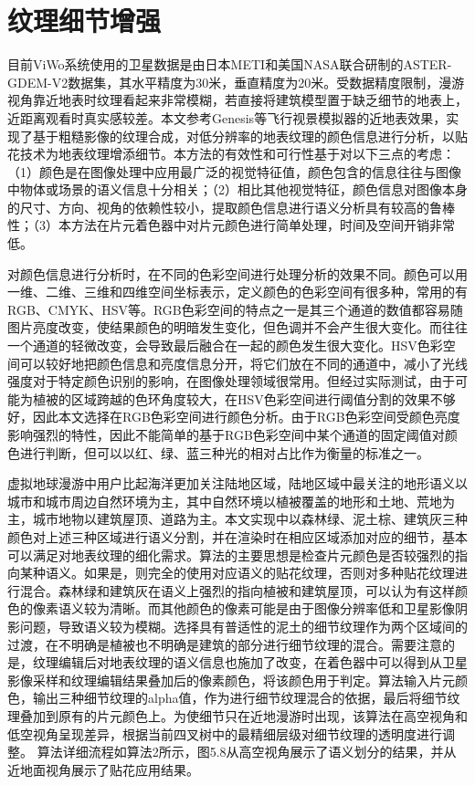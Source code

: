 \section{纹理细节增强}
目前ViWo系统使用的卫星数据是由日本METI和美国NASA联合研制的ASTER-GDEM-V2数据集，其水平精度为30米，垂直精度为20米。受数据精度限制，漫游视角靠近地表时纹理看起来非常模糊，若直接将建筑模型置于缺乏细节的地表上，近距离观看时真实感较差。本文参考Genesis\supercite{genesis}等飞行视景模拟器的近地表效果，实现了基于粗糙影像的纹理合成，对低分辨率的地表纹理的颜色信息进行分析，以贴花技术为地表纹理增添细节。本方法的有效性和可行性基于对以下三点的考虑：（1）颜色是在图像处理中应用最广泛的视觉特征值，颜色包含的信息往往与图像中物体或场景的语义信息十分相关；（2）相比其他视觉特征，颜色信息对图像本身的尺寸、方向、视角的依赖性较小，提取颜色信息进行语义分析具有较高的鲁棒性；（3）本方法在片元着色器中对片元颜色进行简单处理，时间及空间开销非常低。\par
对颜色信息进行分析时，在不同的色彩空间进行处理分析的效果不同。颜色可以用一维、二维、三维和四维空间坐标表示，定义颜色的色彩空间有很多种，常用的有RGB、CMYK、HSV等。RGB色彩空间的特点之一是其三个通道的数值都容易随图片亮度改变，使结果颜色的明暗发生变化，但色调并不会产生很大变化。而往往一个通道的轻微改变，会导致最后融合在一起的颜色发生很大变化。HSV色彩空间可以较好地把颜色信息和亮度信息分开，将它们放在不同的通道中，减小了光线强度对于特定颜色识别的影响，在图像处理领域很常用。但经过实际测试，由于可能为植被的区域跨越的色环角度较大，在HSV色彩空间进行阈值分割的效果不够好，因此本文选择在RGB色彩空间进行颜色分析。由于RGB色彩空间受颜色亮度影响强烈的特性，因此不能简单的基于RGB色彩空间中某个通道的固定阈值对颜色进行判断，但可以以红、绿、蓝三种光的相对占比作为衡量的标准之一。\par
虚拟地球漫游中用户比起海洋更加关注陆地区域，陆地区域中最关注的地形语义以城市和城市周边自然环境为主，其中自然环境以植被覆盖的地形和土地、荒地为主，城市地物以建筑屋顶、道路为主。本文实现中以森林绿、泥土棕、建筑灰三种颜色对上述三种区域进行语义分割，并在渲染时在相应区域添加对应的细节，基本可以满足对地表纹理的细化需求。算法的主要思想是检查片元颜色是否较强烈的指向某种语义。如果是，则完全的使用对应语义的贴花纹理，否则对多种贴花纹理进行混合。森林绿和建筑灰在语义上强烈的指向植被和建筑屋顶，可以认为有这样颜色的像素语义较为清晰。而其他颜色的像素可能是由于图像分辨率低和卫星影像阴影问题，导致语义较为模糊。选择具有普适性的泥土的细节纹理作为两个区域间的过渡，在不明确是植被也不明确是建筑的部分进行细节纹理的混合。需要注意的是，纹理编辑后对地表纹理的语义信息也施加了改变，在着色器中可以得到从卫星影像采样和纹理编辑结果叠加后的像素颜色，将该颜色用于判定。算法输入片元颜色，输出三种细节纹理的alpha值，作为进行细节纹理混合的依据，最后将细节纹理叠加到原有的片元颜色上。为使细节只在近地漫游时出现，该算法在高空视角和低空视角呈现差异，根据当前四叉树中的最精细层级对细节纹理的透明度进行调整。
算法详细流程如算法2所示，图5.8从高空视角展示了语义划分的结果，并从近地面视角展示了贴花应用结果。

